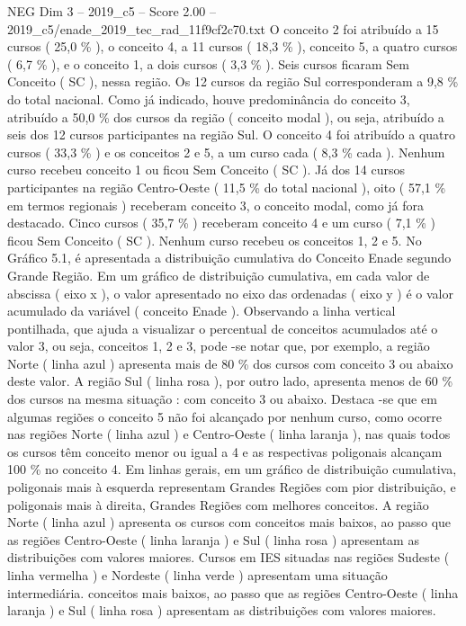 \begin{textsample}{NEG Dim 3 – 2019\_c5 – Score 2.00 – 2019\_c5/enade\_2019\_tec\_rad\_11f9cf2c70.txt}
O conceito 2 foi atribuído a 15 cursos ( 25,0 \% ), o conceito 4, a 11 cursos ( 18,3 \% ), conceito 5, a quatro cursos ( 6,7 \% ), e o conceito 1, a dois cursos ( 3,3 \% ).
Seis cursos ficaram Sem Conceito ( SC ), nessa região.
Os 12 cursos da região Sul corresponderam a 9,8 \% do total nacional.
Como já indicado, houve predominância do conceito 3, atribuído a 50,0 \% dos cursos da região ( conceito modal ), ou seja, atribuído a seis dos 12 cursos participantes na região Sul.
O conceito 4 foi atribuído a quatro cursos ( 33,3 \% ) e os conceitos 2 e 5, a um curso cada ( 8,3 \% cada ).
Nenhum curso recebeu conceito 1 ou ficou Sem Conceito ( SC ).
Já dos 14 cursos participantes na região Centro-Oeste ( 11,5 \% do total nacional ), oito ( 57,1 \% em termos regionais ) receberam conceito 3, o conceito modal, como já fora destacado.
Cinco cursos ( 35,7 \% ) receberam conceito 4 e um curso ( 7,1 \% ) ficou Sem Conceito ( SC ).
Nenhum curso recebeu os conceitos 1, 2 e 5.
No Gráfico 5.1, é apresentada a distribuição cumulativa do Conceito Enade segundo Grande Região.
Em um gráfico de distribuição cumulativa, em cada valor de abscissa ( eixo x ), o valor apresentado no eixo das ordenadas ( eixo y ) é o valor acumulado da variável ( conceito Enade ).
Observando a linha vertical pontilhada, que ajuda a visualizar o percentual de conceitos acumulados até o valor 3, ou seja, conceitos 1, 2 e 3, pode -se notar que, por exemplo, a região Norte ( linha azul ) apresenta mais de 80 \% dos cursos com conceito 3 ou abaixo deste valor.
A região Sul ( linha rosa ), por outro lado, apresenta menos de 60 \% dos cursos na mesma situação : com conceito 3 ou abaixo.
Destaca -se que em algumas regiões o conceito 5 não foi alcançado por nenhum curso, como ocorre nas regiões Norte ( linha azul ) e Centro-Oeste ( linha laranja ), nas quais todos os cursos têm conceito menor ou igual a 4 e as respectivas poligonais alcançam 100 \% no conceito 4.
Em linhas gerais, em um gráfico de distribuição cumulativa, poligonais mais à esquerda representam Grandes Regiões com pior distribuição, e poligonais mais à direita, Grandes Regiões com melhores conceitos.
A região Norte ( linha azul ) apresenta os cursos com conceitos mais baixos, ao passo que as regiões Centro-Oeste ( linha laranja ) e Sul ( linha rosa ) apresentam as distribuições com valores maiores.
Cursos em IES situadas nas regiões Sudeste ( linha vermelha ) e Nordeste ( linha verde ) apresentam uma situação intermediária. conceitos mais baixos, ao passo que as regiões Centro-Oeste ( linha laranja ) e Sul ( linha rosa ) apresentam as distribuições com valores maiores.

\end{textsample}
